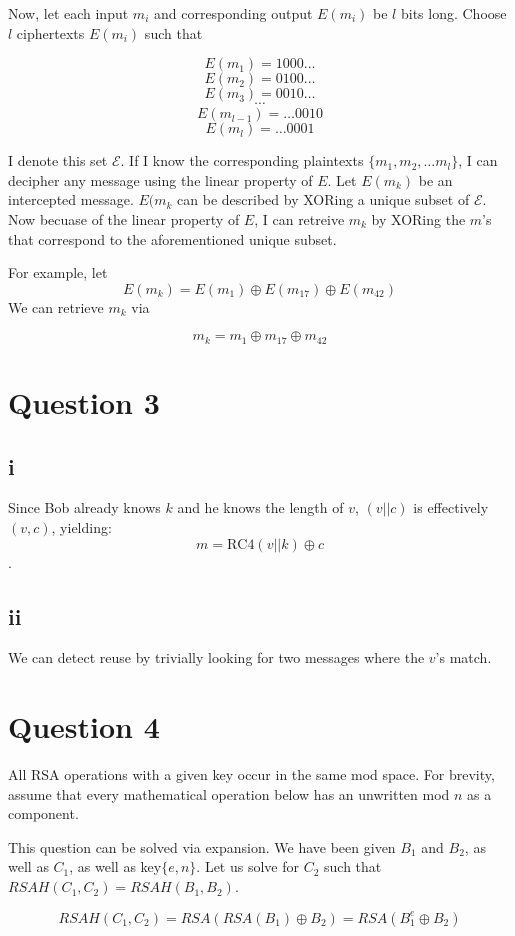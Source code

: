 \documentclass[a4paper,10pt]{article}
\begin{document}
Now, let each input $m_{i}$ and corresponding output $E(m_{i})$ be $l$ bits long.  Choose $l$ ciphertexts $E(m_{i})$ such that

$$E(m_{1}) = 1000\dots$$
$$E(m_{2}) = 0100\dots$$
$$E(m_{3}) = 0010\dots$$
$$\cdots{}$$
$$E(m_{l-1}) = \dots0010$$
$$E(m_{l}) = \dots0001$$

I denote this set $\mathscr{E}$. If I know the corresponding plaintexts $\{m_{1}, m_{2}, \dots m_{l}  \}$, I can decipher any message using the linear property of $E$. Let $E(m_{k})$ be an intercepted message. $E(m_{k}$ can be described by XORing a unique subset of  $\mathscr{E}$.  Now becuase of the linear property of $E$, I can retreive $m_{k}$ by XORing the $m$'s that correspond to the aforementioned unique subset.  

For example, let $$E(m_{k}) = E(m_{1}) \oplus E(m_{17}) \oplus E(m_{42}) $$ 
We can retrieve $m_{k}$ via

$$m_{k} = m_{1} \oplus m_{17} \oplus m_{42} $$



\section{Question 3}
\subsection{i} Since Bob already knows $k$ and he knows the length of $v$, $(v||c)$ is effectively $(v,c)$, yielding:
$$m = \text{RC4}(v || k) \oplus c$$.
\subsection{ii}
We can detect reuse by trivially looking for two messages where the $v$'s match.


\section{Question 4}
All RSA operations with a given key occur in the same mod space.  For brevity, assume that every mathematical operation below has an unwritten mod $n$ as a component. 

This question can be solved via expansion.  We have been given $B_{1}$ and $B_{2}$, as well as $C_{1}$, as well as key$\{e,n\}$.  Let us solve for $C_{2}$ such that $RSAH(C_{1},C_{2}) = RSAH(B_{1},B_{2})$.

$$RSAH(C_{1},C_{2}) = RSA(RSA(B_{1}) \oplus B_{2} ) = RSA( B_{1}^{e} \oplus B_{2} ) $$
\end{document}
